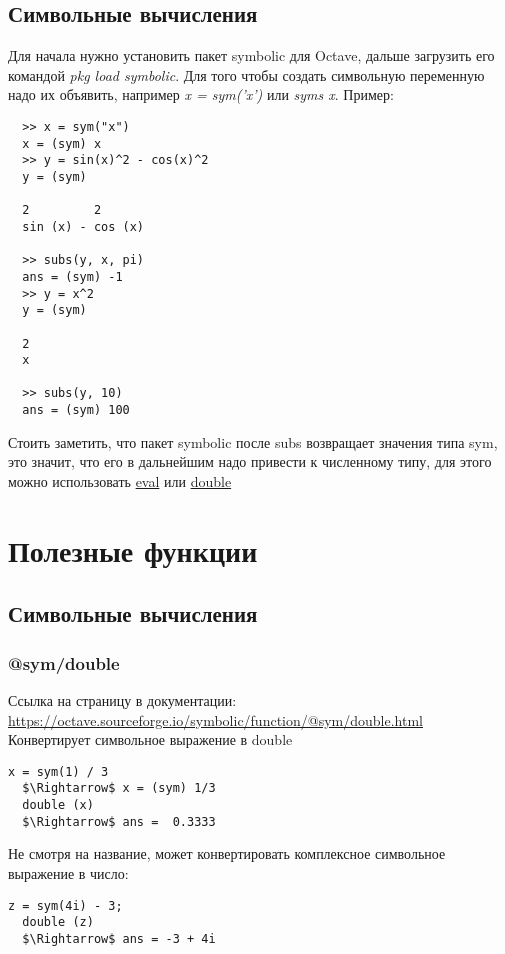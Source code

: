 \documentclass[12pt, a4paper,oneside]{book}
\begin{document}
\section{Символьные вычисления}
Для начала нужно установить пакет symbolic для Octave, дальше загрузить его командой \textit{pkg load symbolic}. Для того чтобы создать символьную переменную надо их объявить, например \textit{x = sym('x')} или \textit{syms x}. Пример:
\begin{lstlisting}
  >> x = sym("x")
  x = (sym) x
  >> y = sin(x)^2 - cos(x)^2
  y = (sym)

  2         2
  sin (x) - cos (x)

  >> subs(y, x, pi)
  ans = (sym) -1
  >> y = x^2
  y = (sym)

  2
  x

  >> subs(y, 10)
  ans = (sym) 100
\end{lstlisting}
Стоить заметить, что пакет symbolic после subs возвращает значения типа sym, это значит, что его в дальнейшим надо привести к численному типу, для этого можно использовать \hyperref[sec:sym/eval]{eval} или \hyperref[sec:sym/double]{double}
\chapter{Полезные функции}

\section{Символьные вычисления}

\subsection{@sym/double} \label{sec:sym/double}
Ссылка на страницу в документации: \url{https://octave.sourceforge.io/symbolic/function/@sym/double.html}\\
Конвертирует символьное выражение в double
\begin{lstlisting}[mathescape]
  x = sym(1) / 3
  $\Rightarrow$ x = (sym) 1/3
  double (x)
  $\Rightarrow$ ans =  0.3333
\end{lstlisting}
Не смотря на название, может конвертировать комплексное символьное выражение в число:
\begin{lstlisting}[mathescape]
  z = sym(4i) - 3;
  double (z)
  $\Rightarrow$ ans = -3 + 4i
\end{lstlisting}
\end{document}
